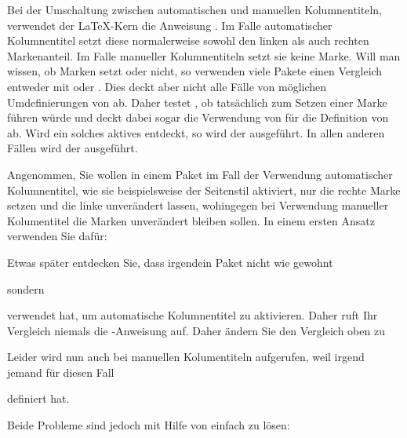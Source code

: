 \begin{Declaration}
\end{Declaration}
Bei der Umschaltung zwischen automatischen
und manuellen Kolumnentiteln, verwendet der \LaTeX-Kern die Anweisung
.
Im Falle automatischer Kolumnentitel setzt diese normalerweise sowohl den
linken als auch rechten Markenanteil. Im Falle manueller Kolumnentiteln setzt
sie keine Marke. Will man wissen, ob  Marken
setzt oder nicht, so verwenden viele Pakete einen Vergleich entweder mit
 oder
. Dies deckt aber nicht alle Fälle von möglichen
Umdefinierungen von  ab. Daher testet
, ob  tatsächlich zum
Setzen einer Marke führen würde und deckt dabei sogar die Verwendung von
 für die Definition von  ab. Wird
ein solches aktives  entdeckt, so wird der
 ausgeführt. In allen anderen Fällen wird der
 ausgeführt.%
\begin{Example}
  Angenommen, Sie wollen in einem Paket im Fall der Verwendung automatischer
  Kolumnentitel, wie sie beispielsweise der Seitenstil
   aktiviert, nur die rechte
  Marke setzen und die linke unverändert lassen, wohingegen bei Verwendung
  manueller Kolumentitel die Marken unverändert bleiben sollen. In einem
  ersten Ansatz verwenden Sie dafür:
\begin{lstcode}
  \ifx\@mkboth\markboth {}\fi
\end{lstcode}
  Etwas später entdecken Sie, dass irgendein Paket nicht wie gewohnt
\begin{lstcode}
  \let\@mkboth\markboth
\end{lstcode}
  sondern
\begin{lstcode}
  \renewcommand{\@mkboth}{\markboth}
\end{lstcode}
  verwendet hat, um automatische Kolumnentitel zu aktivieren. Daher ruft Ihr
  Vergleich niemals die -Anweisung auf.  Daher
  ändern Sie den Vergleich oben zu
\begin{lstcode}
  \ifx\@mkboth\@gobbletwo
  \else {}\fi
\end{lstcode}
  Leider wird nun  auch bei manuellen
  Kolumentiteln aufgerufen, weil irgend jemand für diesen Fall
\begin{lstcode}
  \renewcommand{\@mkboth}[2]{%
    \typeout{DEBUG: ignoring running head setting}%
  }
\end{lstcode}
  definiert hat.

  Beide Probleme sind jedoch mit Hilfe von  einfach zu lösen:
\begin{lstcode}
\end{lstcode}%
\end{Example}
